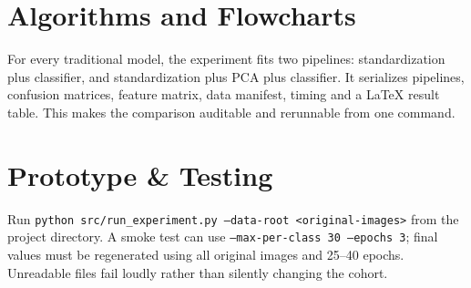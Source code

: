 \section{Algorithms and Flowcharts}
For every traditional model, the experiment fits two pipelines: standardization plus classifier, and standardization plus PCA plus classifier. It serializes pipelines, confusion matrices, feature matrix, data manifest, timing and a LaTeX result table. This makes the comparison auditable and rerunnable from one command.
\section{Prototype \& Testing}
Run \texttt{python src/run\_experiment.py --data-root <original-images>} from the project directory. A smoke test can use \texttt{--max-per-class 30 --epochs 3}; final values must be regenerated using all original images and 25--40 epochs. Unreadable files fail loudly rather than silently changing the cohort.

